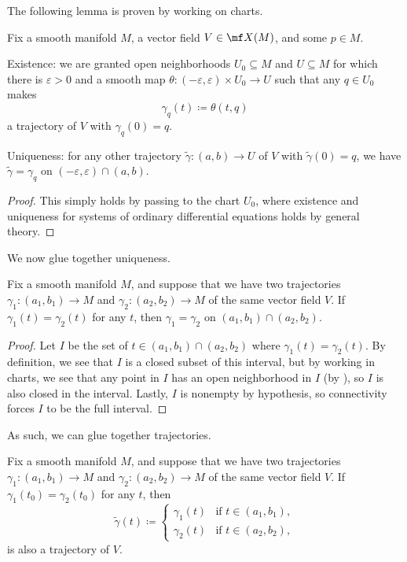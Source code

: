 \documentclass[../notes.tex]{subfiles}
\begin{document}
The following lemma is proven by working on charts.
\begin{lemma} \label{lem:trajectory-on-chart}
	Fix a smooth manifold $M$, a vector field $V\in\mf X(M)$, and some $p\in M$.
	\begin{listalph}
		\item Existence: we are granted open neighborhoods $U_0\subseteq M$ and $U\subseteq M$ for which there is $\varepsilon>0$ and a smooth map $\theta\colon(-\varepsilon,\varepsilon)\times U_0\to U$ such that any $q\in U_0$ makes
		\[\gamma_q(t)\coloneqq\theta(t,q)\]
		a trajectory of $V$ with $\gamma_q(0)=q$.
		\item Uniqueness: for any other trajectory $\widetilde\gamma\colon(a,b)\to U$ of $V$ with $\widetilde\gamma(0)=q$, we have $\widetilde\gamma=\gamma_q$ on $(-\varepsilon,\varepsilon)\cap(a,b)$.
	\end{listalph}
\end{lemma}
\begin{proof}
	This simply holds by passing to the chart $U_0$, where existence and uniqueness for systems of ordinary differential equations holds by general theory.
\end{proof}
We now glue together uniqueness.
\begin{lemma} \label{lem:local-uniq-traj}
	Fix a smooth manifold $M$, and suppose that we have two trajectories $\gamma_1\colon(a_1,b_1)\to M$ and $\gamma_2\colon(a_2,b_2)\to M$ of the same vector field $V$. If $\gamma_1(t)=\gamma_2(t)$ for any $t$, then $\gamma_1=\gamma_2$ on $(a_1,b_1)\cap(a_2,b_2)$.
\end{lemma}
\begin{proof}
	Let $I$ be the set of $t\in(a_1,b_1)\cap(a_2,b_2)$ where $\gamma_1(t)=\gamma_2(t)$. By definition, we see that $I$ is a closed subset of this interval, but by working in charts, we see that any point in $I$ has an open neighborhood in $I$ (by ), so $I$ is also closed in the interval. Lastly, $I$ is nonempty by hypothesis, so connectivity forces $I$ to be the full interval.
\end{proof}
As such, we can glue together trajectories.
\begin{corollary}
	Fix a smooth manifold $M$, and suppose that we have two trajectories $\gamma_1\colon(a_1,b_1)\to M$ and $\gamma_2\colon(a_2,b_2)\to M$ of the same vector field $V$. If $\gamma_1(t_0)=\gamma_2(t_0)$ for any $t$, then
	\[\widetilde\gamma(t)\coloneqq\begin{cases}
		\gamma_1(t) & \text{if }t\in(a_1,b_1), \\
		\gamma_2(t) & \text{if }t\in(a_2,b_2),
	\end{cases}\]
	is also a trajectory of $V$.
\end{corollary}
\end{document}
